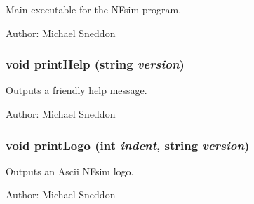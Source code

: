 Main executable for the NFsim program. 

\begin{Desc}
\item[Author:]Michael Sneddon \end{Desc}
\subsubsection{\setlength{\rightskip}{0pt plus 5cm}void printHelp (string {\em version})}\label{NFsim_8cpp_e16641224ad0a169d8db2dbcec348157}


Outputs a friendly help message. 

\begin{Desc}
\item[Author:]Michael Sneddon \end{Desc}
\subsubsection{\setlength{\rightskip}{0pt plus 5cm}void printLogo (int {\em indent}, string {\em version})}\label{NFsim_8cpp_74763fe62871a5e5e685b885c63d30a4}


Outputs an Ascii NFsim logo. 

\begin{Desc}
\item[Author:]Michael Sneddon \end{Desc}
